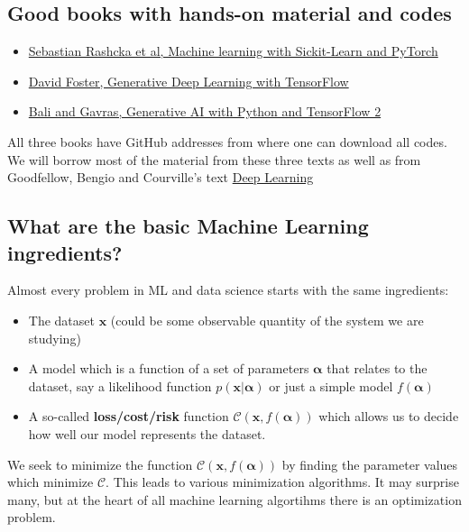 \documentclass[%
oneside,                 %
final,                   %
10pt]{article}
\begin{document}
\vspace{6mm}

\subsection{Good books with hands-on material and codes}
\begin{block}{}
\begin{itemize}
\item \href{{https://sebastianraschka.com/blog/2022/ml-pytorch-book.html}}{Sebastian Rashcka et al, Machine learning with Sickit-Learn and PyTorch}

\item \href{{https://www.oreilly.com/library/view/generative-deep-learning/9781098134174/ch01.html}}{David Foster, Generative Deep Learning with TensorFlow}

\item \href{{https://github.com/PacktPublishing/Hands-On-Generative-AI-with-Python-and-TensorFlow-2}}{Bali and Gavras, Generative AI with Python and TensorFlow 2}
\end{itemize}

\noindent
\end{block}

All three books have GitHub addresses from where  one can download all codes. We will borrow most of the material from these three texts as well as 
from Goodfellow, Bengio and Courville's text \href{{https://www.deeplearningbook.org/}}{Deep Learning}

\subsection{What are the basic Machine Learning ingredients?}
\begin{block}{}
Almost every problem in ML and data science starts with the same ingredients:
\begin{itemize}
\item The dataset $\bm{x}$ (could be some observable quantity of the system we are studying)

\item A model which is a function of a set of parameters $\bm{\alpha}$ that relates to the dataset, say a likelihood  function $p(\bm{x}\vert \bm{\alpha})$ or just a simple model $f(\bm{\alpha})$

\item A so-called \textbf{loss/cost/risk} function $\mathcal{C} (\bm{x}, f(\bm{\alpha}))$ which allows us to decide how well our model represents the dataset. 
\end{itemize}

\noindent
We seek to minimize the function $\mathcal{C} (\bm{x}, f(\bm{\alpha}))$ by finding the parameter values which minimize $\mathcal{C}$. This leads to  various minimization algorithms. It may surprise many, but at the heart of all machine learning algortihms there is an optimization problem. 
\end{block}
\end{document}
